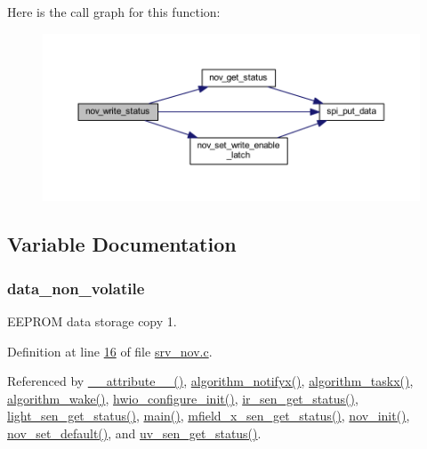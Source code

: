 Here is the call graph for this function\+:
\nopagebreak
\begin{figure}[H]
\begin{center}
\leavevmode
\includegraphics[width=350pt]{d9/d73/a00060_a495e93d64734be469f6725de24dd44e1_cgraph}
\end{center}
\end{figure}




\subsection{Variable Documentation}
\hypertarget{a00060_a76ac5f917f5308dcd83de0d7c94559fb}{
\subsubsection[{data\+\_\+non\+\_\+volatile}]{ data\+\_\+non\+\_\+volatile}}\label{a00060_a76ac5f917f5308dcd83de0d7c94559fb}


E\+E\+P\+R\+O\+M data storage copy 1. 



Definition at line \hyperlink{a00060_source_l00016}{16} of file \hyperlink{a00060_source}{srv\+\_\+nov.\+c}.



Referenced by \hyperlink{a00041_source_l00025}{\+\_\+\+\_\+attribute\+\_\+\+\_\+()}, \hyperlink{a00038_source_l02006}{algorithm\+\_\+notifyx()}, \hyperlink{a00038_source_l01905}{algorithm\+\_\+taskx()}, \hyperlink{a00038_source_l00670}{algorithm\+\_\+wake()}, \hyperlink{a00056_source_l00041}{hwio\+\_\+configure\+\_\+init()}, \hyperlink{a00045_source_l00302}{ir\+\_\+sen\+\_\+get\+\_\+status()}, \hyperlink{a00047_source_l00204}{light\+\_\+sen\+\_\+get\+\_\+status()}, \hyperlink{a00048_source_l00080}{main()}, \hyperlink{a00050_source_l00276}{mfield\+\_\+x\+\_\+sen\+\_\+get\+\_\+status()}, \hyperlink{a00060_source_l00159}{nov\+\_\+init()}, \hyperlink{a00060_source_l00760}{nov\+\_\+set\+\_\+default()}, and \hyperlink{a00073_source_l00302}{uv\+\_\+sen\+\_\+get\+\_\+status()}.

